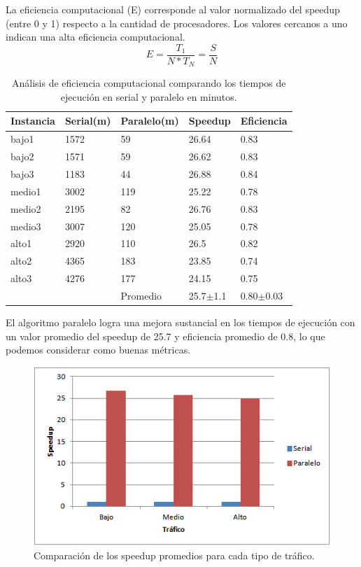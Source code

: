 La eficiencia computacional (E) corresponde al valor normalizado del speedup (entre 0 y 1) respecto a la cantidad de procesadores. Los valores cercanos a uno indican una alta eficiencia computacional.
\begin{equation}
\label{eq:funcion_eficiencia}
E = \frac{T_1}{N*T_N} = \frac{S}{N}
\end{equation}



\begin{table}[H]
	\renewcommand{\arraystretch}{1.2}
	\caption{Análisis de eficiencia computacional comparando los tiempos de ejecución en serial y paralelo en minutos. }
	\label{table:analisis_speedup}
	\centering
	\begin{tabular}{p{2.5cm}p{2.5cm}p{2.5cm}p{2.5cm}p{2.5cm} }
		\hline
		
		Instancia& 
		Serial(m) & 
		Paralelo(m) &
		Speedup &
		Eficiencia
		\\ 
		\hline
		bajo1  & 1572 & 59 & 26.64 & 0.83\\
		bajo2  & 1571 & 59 & 26.62 & 0.83\\
		bajo3  & 1183 & 44 & 26.88 & 0.84\\
		
		medio1  & 3002 & 119 & 25.22 & 0.78\\
		medio2  & 2195 & 82 & 26.76 & 0.83\\
		medio3  & 3007 & 120 & 25.05 & 0.78\\
		
		alto1  & 2920 & 110 & 26.5 & 0.82\\
		alto2  & 4365 & 183 & 23.85 & 0.74\\
		alto3  & 4276 & 177 & 24.15 & 0.75\\
		\hline
		  &  & Promedio & 25.7$\pm$1.1 & 0.80$\pm$0.03\\
		
		\hline
	\end{tabular}
\end{table}


El algoritmo paralelo logra una mejora sustancial en los tiempos de ejecución con un valor promedio del speedup de 25.7  y  eficiencia promedio de 0.8, lo que podemos considerar como buenas métricas.

\begin{figure}[h]
	\centering
	\includegraphics[width=0.7\linewidth]{Figures/speedup1}
	\caption{Comparación de los speedup promedios para cada tipo de tráfico.}
	\label{fig:speedup1}
\end{figure}

